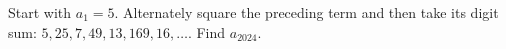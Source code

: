 Start with $a_1=5$. Alternately square the preceding term and then take its digit sum: $5,25,7,49,13,169,16,\ldots$. Find $a_{2024}$.
